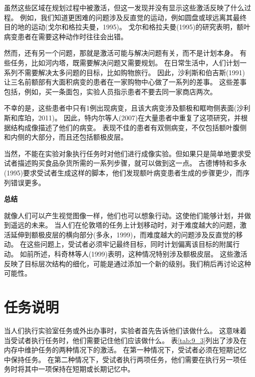 虽然这些区域在规划过程中被激活，但这一发现并没有显示这些激活反映了什么过程。
例如，我们知道更困难的问题涉及反直觉的运动，例如圆盘或球远离其最终目的地的运动(戈尔和格拉夫曼，1995)。
戈尔和格拉夫曼(1995)的研究表明，额叶病变患者在需要这种动作时往往会出错。
\par


然而，还有另一个问题，那就是激活可能与解决问题有关，而不是计划本身。
有些任务，比如河内塔，既需要解决问题又需要规划。
在日常生活中，人们计划一系列不需要解决太多问题的目标，比如购物旅行。
因此，沙利斯和伯吉斯(1991)让三名前额部有大面积病变的患者在一家购物中心做了一系列的差事。
这些差事包括，例如，买一条面包，实验人员指示患者不要去同一家商店两次。
\par


不幸的是，这些患者中只有1例出现病变，且该大病变涉及额极和眶吻侧表面(沙利斯和库珀，2011)。
因此，特内尔等人(2007)在大量患者中重复了这项研究，并根据结构成像描述了他们的病变。
表现不佳的患者有双侧病变，不仅包括额叶腹侧和内侧的大部分，而且还包括额极皮层。
\par


当然，不能在实验对象执行任务时对他们进行成像实验。但如果只是简单地要求受试者描述购买食品杂货所需的一系列步骤，就可以做到这一点。
古德博特和多永(1995)要求受试者生成这样的脚本，他们发现额叶病变患者生成的步骤更少，而序列错误更多。
\par


\textbf{总结}

就像人们可以产生视觉图像一样，他们也可以想象行动。这使他们能够计划，并做到遥远的未来。
当人们在伦敦塔的任务上计划移动时，对于难度越大的问题，激活延伸到额极皮层的横向部分(多永，1999)，而难度越大的问题涉及反直觉的移动。
在这些问题上，受试者必须牢记最终目标，同时计划偏离该目标的附属行动。
如前所述，科奇林等人(1999)表明，这种情况特别涉及额极皮层。
这些激活反映了目标层次结构的细化，可能是通过添加一个新的级别。我们稍后再讨论这种可能性。



\section{任务说明}
\par

当人们执行实验室任务或外出办事时，实验者首先告诉他们该做什么。
这意味着当受试者执行任务时，他们需要记住他们应该做什么。
表\ref{tab:9_3}列出了涉及在内存中维护任务的两种情况下的激活。
在第一种情况下，受试者必须在短期记忆中保持任务。
在第二种情况下，受试者执行两项任务，他们需要在执行另一项任务时将其中一项保持在短期或长期记忆中。



